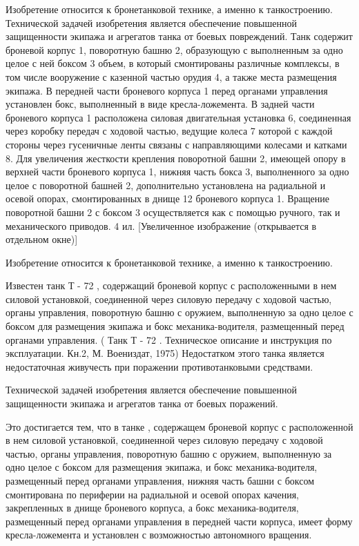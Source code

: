 Изобретение относится к бронетанковой технике, а именно к танкостроению. Технической задачей изобретения является обеспечение повышенной защищенности экипажа и агрегатов танка от боевых повреждений. Танк содержит броневой корпус 1, поворотную башню 2, образующую с выполненным за одно целое с ней боксом 3 объем, в который смонтированы различные комплексы, в том числе вооружение с казенной частью орудия 4, а также места размещения экипажа. В передней части броневого корпуса 1 перед органами управления установлен бокс, выполненный в виде кресла-ложемента. В задней части броневого корпуса 1 расположена силовая двигательная установка 6, соединенная через коробку передач с ходовой частью, ведущие колеса 7 которой с каждой стороны через гусеничные ленты связаны с направляющими колесами и катками 8. Для увеличения жесткости крепления поворотной башни 2, имеющей опору в верхней части броневого корпуса 1, нижняя часть бокса 3, выполненного за одно целое с поворотной башней 2, дополнительно установлена на радиальной и осевой опорах, смонтированных в днище 12 броневого корпуса 1. Вращение поворотной башни 2 с боксом 3 осуществляется как с помощью ручного, так и механического приводов. 4 ил. [Увеличенное изображение (открывается в отдельном окне)]

Изобретение относится к бронетанковой технике, а именно к танкостроению.

Известен танк Т - 72 , содержащий броневой корпус с расположенными в нем силовой установкой, соединенной через силовую передачу с ходовой частью, органы управления, поворотную башню с оружием, выполненную за одно целое с боксом для размещения экипажа и бокс механика-водителя, размещенный перед органами управления. ( Танк Т - 72 . Техническое описание и инструкция по эксплуатации. Кн.2, М. Воениздат, 1975)
Недостатком этого танка является недостаточная живучесть при поражении противотанковыми средствами.

Технической задачей изобретения является обеспечение повышенной защищенности экипажа и агрегатов танка от боевых поражений.

Это достигается тем, что в танке , содержащем броневой корпус с расположенной в нем силовой установкой, соединенной через силовую передачу с ходовой частью, органы управления, поворотную башню с оружием, выполненную за одно целое с боксом для размещения экипажа, и бокс механика-водителя, размещенный перед органами управления, нижняя часть башни с боксом смонтирована по периферии на радиальной и осевой опорах качения, закрепленных в днище броневого корпуса, а бокс механика-водителя, размещенный перед органами управления в передней части корпуса, имеет форму кресла-ложемента и установлен с возможностью автономного вращения.

